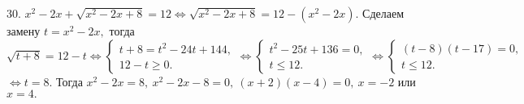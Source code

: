 30. $x^2-2x+\sqrt{x^2-2x+8}=12\Leftrightarrow\sqrt{x^2-2x+8}=12-(x^2-2x).$ Сделаем замену $t=x^2-2x,$ тогда $\sqrt{t+8}=12-t\Leftrightarrow
\begin{cases}t+8=t^2-24t+144,\\ 12-t\geqslant0.\end{cases}\Leftrightarrow
\begin{cases}t^2-25t+136=0,\\ t\leqslant12.\end{cases}\Leftrightarrow
\begin{cases}(t-8)(t-17)=0,\\ t\leqslant12.\end{cases}$\\$\Leftrightarrow t=8.$ Тогда $x^2-2x=8,\ x^2-2x-8=0,\ (x+2)(x-4)=0,\ x=-2$ или $x=4.$\\
